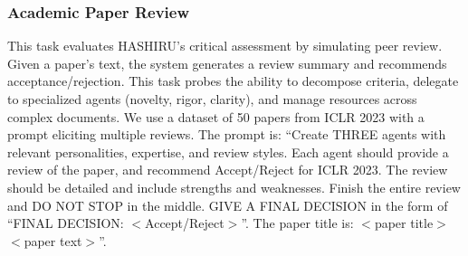 \documentclass[conference]{IEEEtran}
\begin{document}
\subsubsection{Academic Paper Review}
This task evaluates HASHIRU's critical assessment by simulating peer review. Given a paper's text, the system generates a review summary and recommends acceptance/rejection. This task probes the ability to decompose criteria, delegate to specialized agents (novelty, rigor, clarity), and manage resources across complex documents.
We use a dataset of 50 papers from ICLR 2023 with a prompt eliciting multiple reviews. The prompt is: ``Create THREE agents with relevant personalities, expertise, and review styles. Each agent should provide a review of the paper, and recommend Accept/Reject for ICLR 2023. The review should be detailed and include strengths and weaknesses. Finish the entire review and DO NOT STOP in the middle. GIVE A FINAL DECISION in the form of ``FINAL DECISION: $<$Accept/Reject$>$''. The paper title is: $<$paper title$>$ $<$paper text$>$''.
\end{document}
